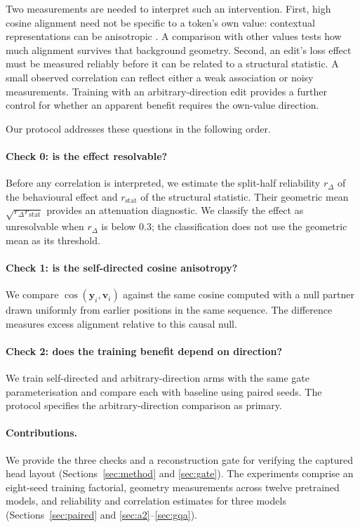 \documentclass{article} %
\newcommand{\yv}{\mathbf{y}}
\begin{document}
Two measurements are needed to interpret such an intervention. First, high
cosine alignment need not be specific to a token's own value:
contextual representations can be anisotropic \citep{ethayarajh2019contextual}.
A comparison with other values tests how much alignment survives that
background geometry. Second, an edit's loss effect must be measured
reliably before it can be related to a structural statistic. A small observed
correlation can reflect either a weak association or noisy measurements.
Training with an arbitrary-direction edit provides a further control for
whether an apparent benefit requires the own-value direction.

Our protocol addresses these questions in the following order.

\paragraph{Check 0: is the effect resolvable?} Before any correlation is
interpreted, we estimate the split-half reliability $r_\Delta$ of the
behavioural effect and $r_{\text{stat}}$ of the structural statistic. Their
geometric mean $\sqrt{r_\Delta r_{\text{stat}}}$ provides an attenuation
diagnostic. We classify the effect as unresolvable when $r_\Delta$ is below
$0.3$; the classification does not use the geometric mean as its threshold.

\paragraph{Check 1: is the self-directed cosine anisotropy?} We compare
$\cos(\yv_i, \mathbf{v}_i)$ against the same cosine computed with a null
partner drawn uniformly from earlier positions in the same sequence.
The difference measures excess alignment relative to this causal null.

\paragraph{Check 2: does the training benefit depend on direction?} We train
self-directed and arbitrary-direction arms with the same gate
parameterisation and compare each with baseline using paired seeds.
The protocol specifies the arbitrary-direction comparison as primary.

\paragraph{Contributions.}
We provide the three checks and a reconstruction gate for verifying the
captured head layout (Sections~\ref{sec:method} and \ref{sec:gate}). The
experiments comprise an eight-seed training factorial, geometry measurements
across twelve pretrained models, and reliability and correlation estimates
for three models (Sections~\ref{sec:paired} and
\ref{sec:a2}--\ref{sec:gqa}).
\end{document}
